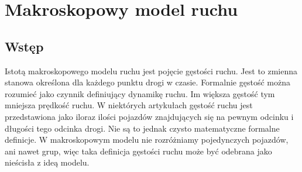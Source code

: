 \documentclass[12pt]{book}
\begin{document}
\section{Makroskopowy model ruchu} 
\subsection{Wstęp}
Istotą makroskopowego modelu ruchu jest pojęcie gęstości ruchu. Jest to zmienna stanowa określona dla każdego punktu drogi w czasie. Formalnie gęstość można rozumieć jako czynnik definiujący dynamikę ruchu. Im większa gęstość tym mniejsza prędkość ruchu. W niektórych artykułach gęstość ruchu \cite{helbing2001master} jest przedstawiona jako iloraz ilości pojazdów znajdujących się na pewnym odcinku i długości tego odcinka drogi. Nie są to jednak czysto matematyczne formalne definicje. W makroskopowym modelu nie rozróżniamy pojedynczych pojazdów, ani nawet grup, więc taka definicja gęstości ruchu może być odebrana jako nieścisła z ideą modelu. 
\end{document}
